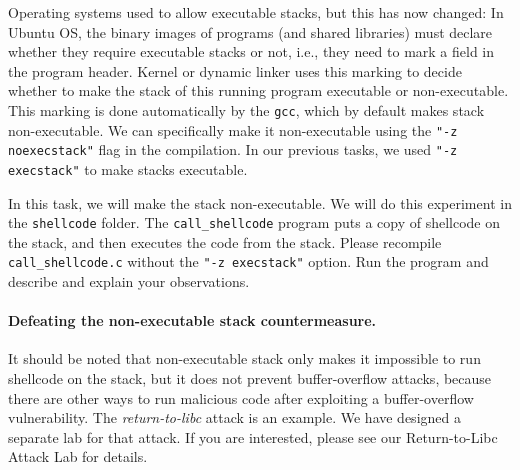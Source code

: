 
Operating systems used to allow executable stacks, but
this has now changed: In Ubuntu OS, the binary images of programs (and shared libraries)
must declare whether they require executable stacks or not, i.e., they need to
mark a field in the program header. Kernel or dynamic linker uses this marking
to decide whether to make the stack of this running program executable or
non-executable. This marking is done automatically by the
\texttt{gcc}, which by default makes stack
non-executable. We can specifically make it non-executable
using the \texttt{"-z noexecstack"} flag in the compilation.
In our previous tasks, we used \texttt{"-z execstack"} to
make stacks executable.


In this task, we will make the stack non-executable. We will do
this experiment in the \texttt{shellcode} folder.
The \texttt{call\_shellcode} program puts a copy of shellcode
on the stack, and then executes the code from the stack.
Please recompile \texttt{call\_shellcode.c} without
the \texttt{"-z execstack"} option.
Run the program and describe and explain your observations.


\paragraph{Defeating the non-executable stack countermeasure.}
It should be noted that non-executable stack only makes it
impossible to run shellcode
on the stack, but it does not prevent buffer-overflow attacks,
because there are other ways to run malicious code after exploiting
a buffer-overflow vulnerability. The {\em return-to-libc} attack
is an example. We have designed a separate lab for that
attack. If you are interested, please see our
Return-to-Libc Attack Lab for details.

